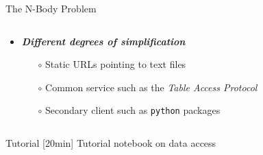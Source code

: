 \begin{frame}[t]{The N-Body Problem}
\begin{columns}[T]
\begin{column}{.7\textwidth}
\begin{overlayarea}{\textwidth}{\textheight}
      \vspace{1.0em}
        \begin{itemize}[<.->]
          \item \emph{\bf Different degrees of simplification}
            \begin{itemize}[<.->]
              \item[$\circ$] Static URLs pointing to text files
              \item[$\circ$] Common service such as the \textit{Table Access Protocol}
              \item[$\circ$] Secondary client such as \texttt{python} packages
            \end{itemize}
        \end{itemize}
      \vspace{0.5em}
      \end{overlayarea}
    \end{column}
  \end{columns}

\end{frame}

\begin{frame}[t]{Tutorial}
  [20min] Tutorial notebook on data access
\end{frame}
